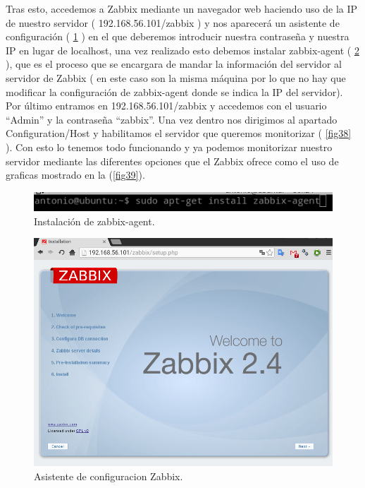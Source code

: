 Tras esto, accedemos a Zabbix mediante un navegador web haciendo uso de la IP de nuestro servidor ( 192.168.56.101/zabbix ) y nos aparecerá un asistente de configuración ( \cref{fig36} ) en el que deberemos introducir nuestra contraseña y nuestra IP en lugar de localhost, una vez realizado esto debemos instalar zabbix-agent ( \cref{fig37} ), que es el proceso que se encargara de mandar la información del servidor al servidor de Zabbix ( en este caso son la misma máquina por lo que no hay que modificar la configuración de zabbix-agent donde se indica la IP del servidor). Por último entramos en 192.168.56.101/zabbix y accedemos con el usuario ``Admin'' y la contraseña ``zabbix''. Una vez dentro nos dirigimos al apartado Configuration/Host y habilitamos el servidor que queremos monitorizar ( \cref{fig38} ). Con esto lo tenemos todo funcionando y ya podemos monitorizar nuestro servidor mediante las diferentes opciones que el Zabbix ofrece como el uso de graficas mostrado en la (\cref{fig39}).   

\begin{figure}[H]
  \begin{center}
    \includegraphics[width=1\textwidth]{imagenes/zab9}
    \caption{Instalación de zabbix-agent.}
    \label{fig36}
  \end{center}
\end{figure}

\begin{figure}[H]
  \begin{center}
    \includegraphics[width=1\textwidth]{imagenes/asist}
    \caption{Asistente de configuracion Zabbix.}
    \label{fig37}
  \end{center}
\end{figure}

